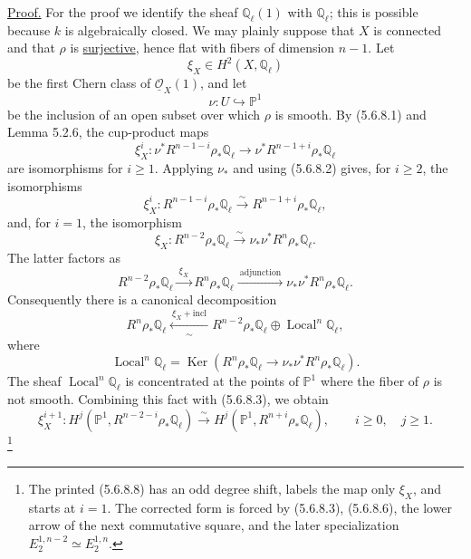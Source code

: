\underline{Proof.}
For the proof we identify the sheaf $\mathbb Q_\ell(1)$ with
$\mathbb Q_\ell$; this is possible because $k$ is algebraically closed.
We may plainly suppose that $X$ is connected and that $\rho$ is
\underline{surjective}, hence flat with fibers of dimension $n-1$.  Let
\[
\xi_X\in H^2(X,\mathbb Q_\ell)
\]
be the first Chern class of $\underline{\mathcal O}_X(1)$, and let
\[
\nu:U\hookrightarrow\mathbb P^1
\]
be the inclusion of an open subset over which $\rho$ is smooth.  By
(5.6.8.1) and Lemma 5.2.6, the cup-product maps
\[
\xi_X^i:
\nu^*R^{n-1-i}\rho_*\mathbb Q_\ell
\longrightarrow
\nu^*R^{n-1+i}\rho_*\mathbb Q_\ell
\]
are isomorphisms for $i\geq1$.  Applying $\nu_*$ and using (5.6.8.2) gives,
for $i\geq2$, the isomorphisms
\begin{equation}\tag{5.6.8.3}
\xi_X^i:R^{n-1-i}\rho_*\mathbb Q_\ell
\overset{\sim}{\longrightarrow}
R^{n-1+i}\rho_*\mathbb Q_\ell,
\end{equation}
and, for $i=1$, the isomorphism
\begin{equation}\tag{5.6.8.4}
\xi_X:R^{n-2}\rho_*\mathbb Q_\ell
\overset{\sim}{\longrightarrow}
\nu_*\nu^*R^n\rho_*\mathbb Q_\ell.
\end{equation}
The latter factors as
\begin{equation}\tag{5.6.8.5}
R^{n-2}\rho_*\mathbb Q_\ell
\xrightarrow{\ \xi_X\ }
R^n\rho_*\mathbb Q_\ell
\xrightarrow{\ \text{adjunction}\ }
\nu_*\nu^*R^n\rho_*\mathbb Q_\ell.
\end{equation}
Consequently there is a canonical decomposition
\begin{equation}\tag{5.6.8.6}
R^n\rho_*\mathbb Q_\ell
\xleftarrow[\sim]{\ \xi_X+\mathrm{incl}\ }
R^{n-2}\rho_*\mathbb Q_\ell\oplus
\operatorname{Local}^n\mathbb Q_\ell,
\end{equation}
where
\begin{equation}\tag{5.6.8.7}
\operatorname{Local}^n\mathbb Q_\ell
=\operatorname{Ker}\!\left(
R^n\rho_*\mathbb Q_\ell
\longrightarrow\nu_*\nu^*R^n\rho_*\mathbb Q_\ell
\right).
\end{equation}
The sheaf $\operatorname{Local}^n\mathbb Q_\ell$ is concentrated at the
points of $\mathbb P^1$ where the fiber of $\rho$ is not smooth.  Combining
this fact with (5.6.8.3), we obtain
\begin{equation}\tag{5.6.8.8}
\xi_X^{i+1}:
H^j(\mathbb P^1,R^{n-2-i}\rho_*\mathbb Q_\ell)
\overset{\sim}{\longrightarrow}
H^j(\mathbb P^1,R^{n+i}\rho_*\mathbb Q_\ell),
\qquad i\geq0,\quad j\geq1.
\end{equation}
\footnote{The printed (5.6.8.8) has an odd degree shift, labels the map only
$\xi_X$, and starts at $i=1$.  The corrected form is forced by
(5.6.8.3), (5.6.8.6), the lower arrow of the next commutative square, and
the later specialization $E_2^{1,n-2}\simeq E_2^{1,n}$.}

